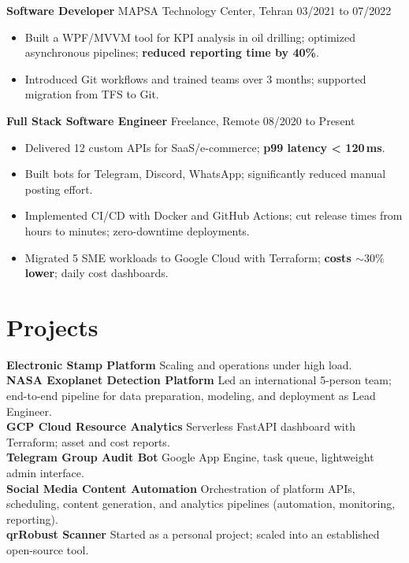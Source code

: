 \documentclass[10pt]{article}
\begin{document}
\textbf{Software Developer} \quad MAPSA Technology Center, Tehran \hfill 03/2021 to 07/2022\\[-1pt]
\begin{itemize}
  \item Built a WPF/MVVM tool for KPI analysis in oil drilling; optimized asynchronous pipelines; \textbf{reduced reporting time by 40\%}.
  \item Introduced Git workflows and trained teams over 3 months; supported migration from TFS to Git.
\end{itemize}

\textbf{Full Stack Software Engineer} \quad Freelance, Remote \hfill 08/2020 to Present \\[-1pt]
\begin{itemize}
  \item Delivered 12 custom APIs for SaaS/e-commerce; \textbf{p99 latency < 120\,ms}.
  \item Built bots for Telegram, Discord, WhatsApp; significantly reduced manual posting effort.
  \item Implemented CI/CD with Docker and GitHub Actions; cut release times from hours to minutes; zero-downtime deployments.
  \item Migrated 5 SME workloads to Google Cloud with Terraform; \textbf{costs \(\sim 30\%\) lower}; daily cost dashboards.
\end{itemize}

\section*{Projects}
\textbf{Electronic Stamp Platform} \quad Scaling and operations under high load.\\
\textbf{NASA Exoplanet Detection Platform} \quad Led an international 5-person team; end-to-end pipeline for data preparation, modeling, and deployment as Lead Engineer.\\
\textbf{GCP Cloud Resource Analytics} \quad Serverless FastAPI dashboard with Terraform; asset and cost reports.\\
\textbf{Telegram Group Audit Bot} \quad Google App Engine, task queue, lightweight admin interface.\\
\textbf{Social Media Content Automation} \quad Orchestration of platform APIs, scheduling, content generation, and analytics pipelines (automation, monitoring, reporting).\\
\textbf{qrRobust Scanner} \quad Started as a personal project; scaled into an established open-source tool.\\
\end{document}
